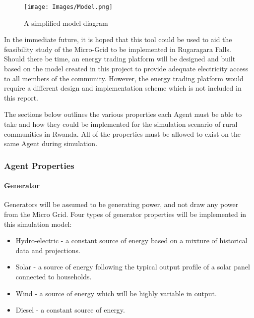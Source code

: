 \documentclass{article}
\begin{document}
\begin{figure}[h!]
\centering
\texttt{[image: Images/Model.png]}
\caption{A simplified model diagram}
\label{fig:SimpleModel}
\end{figure}

In the immediate future, it is hoped that this tool could be used to aid the feasibility study of the Micro-Grid to be implemented in Rugaragara Falls. Should there be time, an energy trading platform will be designed and built based on the model created in this project to provide adequate electricity access to all members of the community. However, the energy trading platform would require a different design and implementation scheme which is not included in this report.

The sections below outlines the various properties each Agent must be able to take and how they could be implemented for the simulation scenario of rural communities in Rwanda. All of the properties must be allowed to exist on the same Agent during simulation.

\subsubsection{Agent Properties}

\paragraph{Generator}
Generators will be assumed to be generating power, and not draw any power from the Micro Grid. Four types of generator properties will be implemented in this simulation model: 

\begin{itemize}
  \item Hydro-electric - a constant source of energy based on a mixture of historical data and projections.
  \item Solar - a source of energy following the typical output profile of a solar panel connected to households.
  \item Wind - a source of energy which will be highly variable in output.
  \item Diesel - a constant source of energy.
\end{itemize}
\end{document}
